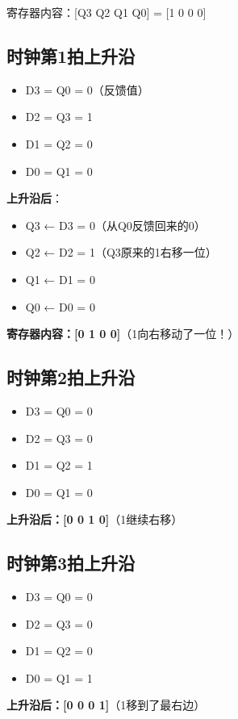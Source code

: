 寄存器内容：[Q3 Q2 Q1 Q0] = [1 0 0 0]

\subsection{时钟第1拍上升沿}

\begin{beatanalysis}
\begin{itemize}
  \item D3 = Q0 = 0（反馈值）
  \item D2 = Q3 = 1
  \item D1 = Q2 = 0
  \item D0 = Q1 = 0
\end{itemize}

\textbf{上升沿后}：
\begin{itemize}
  \item Q3 ← D3 = 0（从Q0反馈回来的0）
  \item Q2 ← D2 = 1（Q3原来的1右移一位）
  \item Q1 ← D1 = 0
  \item Q0 ← D0 = 0
\end{itemize}

\textbf{寄存器内容：[0 1 0 0]}（1向右移动了一位！）
\end{beatanalysis}

\subsection{时钟第2拍上升沿}

\begin{beatanalysis}
\begin{itemize}
  \item D3 = Q0 = 0
  \item D2 = Q3 = 0
  \item D1 = Q2 = 1
  \item D0 = Q1 = 0
\end{itemize}

\textbf{上升沿后：[0 0 1 0]}（1继续右移）
\end{beatanalysis}

\subsection{时钟第3拍上升沿}

\begin{beatanalysis}
\begin{itemize}
  \item D3 = Q0 = 0
  \item D2 = Q3 = 0
  \item D1 = Q2 = 0
  \item D0 = Q1 = 1
\end{itemize}

\textbf{上升沿后：[0 0 0 1]}（1移到了最右边）
\end{beatanalysis}

